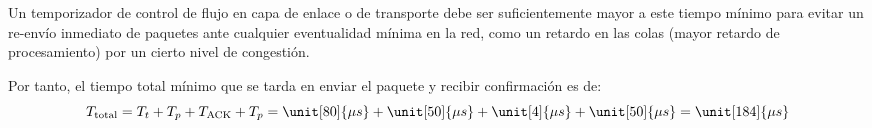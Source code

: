 \begin{ejercicio}
\begin{itemize}
        Un temporizador de control de flujo en capa de enlace o de transporte debe ser
        suficientemente mayor a este tiempo mínimo para evitar un re-envío inmediato de
        paquetes ante cualquier eventualidad mínima en la red, como un retardo en las colas
        (mayor retardo de procesamiento) por un cierto nivel de congestión.
    \end{itemize}

    Por tanto, el tiempo total mínimo que se tarda en enviar el paquete y recibir confirmación es de:
    \begin{equation*}
        T_{\text{total}} = T_t + T_p + T_{\text{ACK}} + T_p = \unit[80]{\mu s} + \unit[50]{\mu s} + \unit[4]{\mu s} + \unit[50]{\mu s} = \unit[184]{\mu s}
    \end{equation*}
\end{ejercicio}